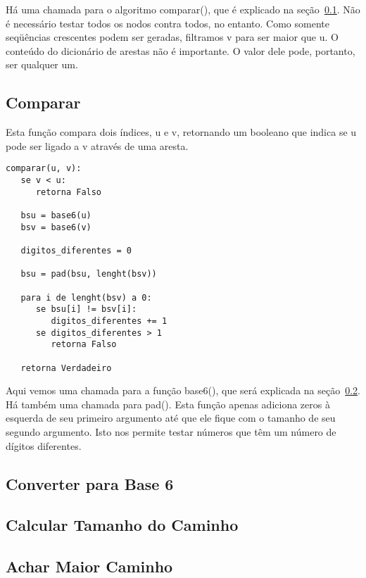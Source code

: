 \documentclass[12pt]{article}
\begin{document}
Há uma chamada para o algoritmo {\sf comparar()}, que é explicado na se\c{c}ão~\ref{sec:algoritmos:comparar}.
Não é necessário testar todos os nodos contra todos, no entanto. Como somente seqüências crescentes podem ser geradas, filtramos {\sf v} para ser maior que {\sf u}.
O conteúdo do dicionário de arestas não é importante. O valor dele pode, portanto, ser qualquer um.

\subsection{Comparar}\label{sec:algoritmos:comparar}
Esta fun\c{c}ão compara dois índices, {\sf u} e {\sf v}, retornando um booleano que indica se {\sf u} pode ser ligado a {\sf v} através de uma aresta.
\begin{lstlisting}
comparar(u, v):
   se v < u:
      retorna Falso

   bsu = base6(u)
   bsv = base6(v)

   digitos_diferentes = 0

   bsu = pad(bsu, lenght(bsv))

   para i de lenght(bsv) a 0:
      se bsu[i] != bsv[i]:
         digitos_diferentes += 1
      se digitos_diferentes > 1
         retorna Falso

   retorna Verdadeiro
\end{lstlisting}

Aqui vemos uma chamada para a fun\c{c}ão {\sf base6()}, que será explicada na se\c{c}ão~\ref{sec:algoritmos:base6}.
Há também uma chamada para {\sf pad()}. Esta fun\c{c}ão apenas adiciona zeros à esquerda de seu primeiro argumento até que ele fique com o tamanho de seu segundo argumento. Isto nos permite testar números que têm um número de dígitos diferentes.


\subsection{Converter para Base 6}\label{sec:algoritmos:base6}

\subsection{Calcular Tamanho do Caminho}\label{sec:algoritmos:calcular-tamanho-caminhos}

\subsection{Achar Maior Caminho}\label{sec:algoritmos:achar-maior-caminho}
\end{document}
